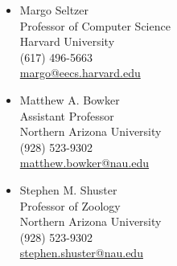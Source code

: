 \documentclass[a4paper]{article}
\begin{document}
\begin{multicols}{2}
\begin{itemize}
\item
  Margo Seltzer\\ Professor of Computer Science\\ Harvard University\\
  (617) 496-5663\\\href{mailto:margo@eecs.harvard.edu}{margo@eecs.harvard.edu}
\item
  Matthew A. Bowker\\ Assistant Professor\\ Northern Arizona
  University\\(928)
  523-9302\\\href{mailto:matthew.bowker@nau.edu}{matthew.bowker@nau.edu}
\item
  Stephen M. Shuster\\ Professor of Zoology\\ Northern Arizona
  University\\(928)
  523-9302\\\href{mailto:stephen.shuster@nau.edu}{stephen.shuster@nau.edu}
\end{itemize}

\end{multicols}
\end{document}
